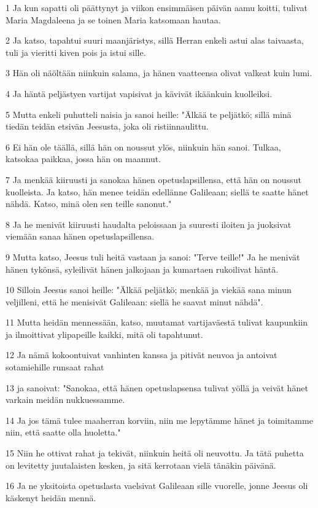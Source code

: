 \par 1 Ja kun sapatti oli päättynyt ja viikon ensimmäisen päivän aamu koitti, tulivat Maria Magdaleena ja se toinen Maria katsomaan hautaa.
\par 2 Ja katso, tapahtui suuri maanjäristys, sillä Herran enkeli astui alas taivaasta, tuli ja vieritti kiven pois ja istui sille.
\par 3 Hän oli näöltään niinkuin salama, ja hänen vaatteensa olivat valkeat kuin lumi.
\par 4 Ja häntä peljästyen vartijat vapisivat ja kävivät ikäänkuin kuolleiksi.
\par 5 Mutta enkeli puhutteli naisia ja sanoi heille: "Älkää te peljätkö; sillä minä tiedän teidän etsivän Jeesusta, joka oli ristiinnaulittu.
\par 6 Ei hän ole täällä, sillä hän on noussut ylös, niinkuin hän sanoi. Tulkaa, katsokaa paikkaa, jossa hän on maannut.
\par 7 Ja menkää kiiruusti ja sanokaa hänen opetuslapsillensa, että hän on noussut kuolleista. Ja katso, hän menee teidän edellänne Galileaan; siellä te saatte hänet nähdä. Katso, minä olen sen teille sanonut."
\par 8 Ja he menivät kiiruusti haudalta peloissaan ja suuresti iloiten ja juoksivat viemään sanaa hänen opetuslapsillensa.
\par 9 Mutta katso, Jeesus tuli heitä vastaan ja sanoi: "Terve teille!" Ja he menivät hänen tykönsä, syleilivät hänen jalkojaan ja kumartaen rukoilivat häntä.
\par 10 Silloin Jeesus sanoi heille: "Älkää peljätkö; menkää ja viekää sana minun veljilleni, että he menisivät Galileaan: siellä he saavat minut nähdä".
\par 11 Mutta heidän mennessään, katso, muutamat vartijaväestä tulivat kaupunkiin ja ilmoittivat ylipapeille kaikki, mitä oli tapahtunut.
\par 12 Ja nämä kokoontuivat vanhinten kanssa ja pitivät neuvoa ja antoivat sotamiehille runsaat rahat
\par 13 ja sanoivat: "Sanokaa, että hänen opetuslapsensa tulivat yöllä ja veivät hänet varkain meidän nukkuessamme.
\par 14 Ja jos tämä tulee maaherran korviin, niin me lepytämme hänet ja toimitamme niin, että saatte olla huoletta."
\par 15 Niin he ottivat rahat ja tekivät, niinkuin heitä oli neuvottu. Ja tätä puhetta on levitetty juutalaisten kesken, ja sitä kerrotaan vielä tänäkin päivänä.
\par 16 Ja ne yksitoista opetuslasta vaelsivat Galileaan sille vuorelle, jonne Jeesus oli käskenyt heidän mennä.

